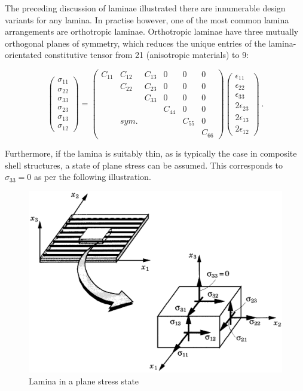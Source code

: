 The preceding discussion of laminae illustrated there are innumerable design variants for any lamina. In practise however, one of the most common lamina arrangements are orthotropic laminae. Orthotropic laminae have three mutually orthogonal planes of symmetry, which reduces the unique entries of the lamina-orientated constitutive tensor from 21 (anisotropic materials) to 9:

\begin{equation} 
\begin{pmatrix}
\sigma_{11} \\
\sigma_{22} \\
\sigma_{33} \\
\sigma_{23} \\
\sigma_{13} \\
\sigma_{12}
\end{pmatrix}
=
\begin{pmatrix}
C_{11} & C_{12} & C_{13} & 0 & 0 & 0 \\
\  & C_{22} & C_{23} & 0 & 0 & 0 \\
\  & \  & C_{33} & 0 & 0 & 0 \\
\  & \  & \  & C_{44} & 0 & 0 \\
\  & sym. & \  & \ & C_{55} & 0 \\
\  & \  & \  & \  & \  & C_{66}
\end{pmatrix}
\begin{pmatrix}
\epsilon_{11} \\
\epsilon_{22} \\
\epsilon_{33} \\
2\epsilon_{23} \\
2\epsilon_{13} \\
2\epsilon_{12}
\end{pmatrix}
\label{eqscomp3}\ .
\end{equation}

Furthermore, if the lamina is suitably thin, as is typically the case in composite shell structures, a state of plane stress can be assumed. This corresponds to $\sigma_{33} = 0$ as per the following illustration.

\begin{figure}[h!]
	\centering
	\includegraphics[width=12cm]{images/composite_lamina_plane_stress}
	\caption{Lamina in a plane stress state \cite{reddy2004mechanics}}
	\label{fig:compositelaminaplanestress}
\end{figure}


